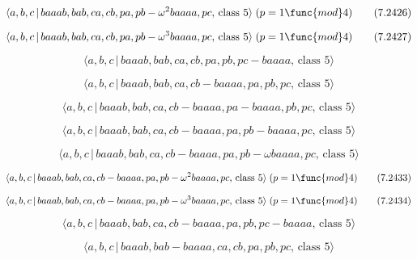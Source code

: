 \documentclass[10pt]{article}
\begin{document}
\begin{equation}
\langle a,b,c\,|\,baaab,bab,ca,cb,pa,pb-\omega ^{2}baaaa,pc,\,\text{class }%
5\rangle \;(p=1\func{mod}4)  \tag{7.2426}
\end{equation}

\begin{equation}
\langle a,b,c\,|\,baaab,bab,ca,cb,pa,pb-\omega ^{3}baaaa,pc,\,\text{class }%
5\rangle \;(p=1\func{mod}4)  \tag{7.2427}
\end{equation}

\begin{equation}
\langle a,b,c\,|\,baaab,bab,ca,cb,pa,pb,pc-baaaa,\,\text{class }5\rangle 
\tag{7.2428}
\end{equation}

\begin{equation}
\langle a,b,c\,|\,baaab,bab,ca,cb-baaaa,pa,pb,pc,\,\text{class }5\rangle 
\tag{7.2429}
\end{equation}

\begin{equation}
\langle a,b,c\,|\,baaab,bab,ca,cb-baaaa,pa-baaaa,pb,pc,\,\text{class }%
5\rangle  \tag{7.2430}
\end{equation}

\begin{equation}
\langle a,b,c\,|\,baaab,bab,ca,cb-baaaa,pa,pb-baaaa,pc,\,\text{class }%
5\rangle  \tag{7.2431}
\end{equation}

\begin{equation}
\langle a,b,c\,|\,baaab,bab,ca,cb-baaaa,pa,pb-\omega baaaa,pc,\,\text{class }%
5\rangle  \tag{7.2432}
\end{equation}

\begin{equation}
\langle a,b,c\,|\,baaab,bab,ca,cb-baaaa,pa,pb-\omega ^{2}baaaa,pc,\,\text{%
class }5\rangle \;(p=1\func{mod}4)  \tag{7.2433}
\end{equation}

\begin{equation}
\langle a,b,c\,|\,baaab,bab,ca,cb-baaaa,pa,pb-\omega ^{3}baaaa,pc,\,\text{%
class }5\rangle \;(p=1\func{mod}4)  \tag{7.2434}
\end{equation}

\begin{equation}
\langle a,b,c\,|\,baaab,bab,ca,cb-baaaa,pa,pb,pc-baaaa,\,\text{class }%
5\rangle  \tag{7.2435}
\end{equation}

\begin{equation}
\langle a,b,c\,|\,baaab,bab-baaaa,ca,cb,pa,pb,pc,\,\text{class }5\rangle 
\tag{7.2436}
\end{equation}
\end{document}
